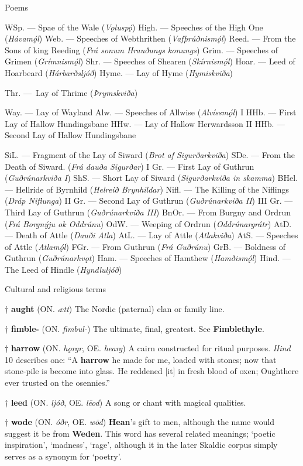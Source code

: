 Poems

WSp. — Spae of the Wale (\emph{Vǫluspǫ́})
High. — Speeches of the High One (\emph{Hávamǫ́l})
Web. — Speeches of Webthrithen (\emph{Vafþrúðnismǫ́l})
Reed. — From the Sons of king Reeding (\emph{Frá sonum Hrauðungs konungs})
Grim. — Speeches of Grimen (\emph{Grímnismǫ́l})
Shr. — Speeches of Shearen (\emph{Skírnismǫ́l})
Hoar. — Leed of Hoarbeard (\emph{Hárbarðsljóð})
Hyme. — Lay of Hyme (\emph{Hymiskviða})

Thr. — Lay of Thrime (\emph{Þrymskviða})

Way. — Lay of Wayland
Alw. — Speeches of Allwise (\emph{Alvíssmǫ́l})
I HHb. — First Lay of Hallow Hundingsbane
HHw. — Lay of Hallow Herwardsson
II HHb. — Second Lay of Hallow Hundingsbane

SiL. — Fragment of the Lay of Siward (\emph{Brot af Sigurðarkviða})
SDe. — From the Death of Siward. (\emph{Frá dauða Sigurðar})
I Gr. — First Lay of Guthrun (\emph{Guðrúnarkviða I})
ShS. — Short Lay of Siward (\emph{Sigurðarkviða in skamma})
BHel. — Hellride of Byrnhild (\emph{Helreið Brynhildar})
Nifl. — The Killing of the Niflings (\emph{Dráp Niflunga})
II Gr. — Second Lay of Guthrun (\emph{Guðrúnarkviða II})
III Gr. — Third Lay of Guthrun (\emph{Guðrúnarkviða III})
BnOr. — From Burgny and Ordrun (\emph{Frá Borgnýju ok Oddrúnu})
OdW. — Weeping of Ordrun (\emph{Oddrúnargrátr})
AtD. — Death of Attle (\emph{Dauði Atla})
AtL. — Lay of Attle (\emph{Atlakviða})
AtS. — Speeches of Attle (\emph{Atlamǫ́l})
FGr. — From Guthrun (\emph{Frá Guðrúnu})
GrB. — Boldness of Guthrun (\emph{Guðrúnarhvǫt})
Ham. — Speeches of Hamthew (\emph{Hamðismǫ́l})
Hind. — The Leed of Hindle (\emph{Hyndluljóð})



Cultural and religious terms

† \textbf{aught} (ON. \emph{ætt})
 The Nordic (paternal) clan or family line.
 
† \textbf{fimble-} (ON. \emph{fimbul-})
 The ultimate, final, greatest. See \textbf{Fimblethyle}.
 
† \textbf{harrow} (ON. \emph{hǫrgr}, OE. \emph{hearg})
 A cairn constructed for ritual purposes. \emph{Hind} 10 describes one: “A \textbf{harrow} he made for me, loaded with stones; now that stone-pile is become into glass. He reddened [it] in fresh blood of oxen; Oughthere ever trusted on the osennies.”
 
† \textbf{leed} (ON. \emph{ljóð}, OE. \emph{lēod})
 A song or chant with magical qualities.
 
† \textbf{wode} (ON. \emph{óðr}, OE. \emph{wōd})
 \textbf{Hean}'s gift to men, although the name would suggest it be from \textbf{Weden}. This word has several related meanings; ‘poetic inspiration’, ‘madness’, ‘rage’, although it in the later Skaldic corpus simply serves as a synonym for ‘poetry’.



